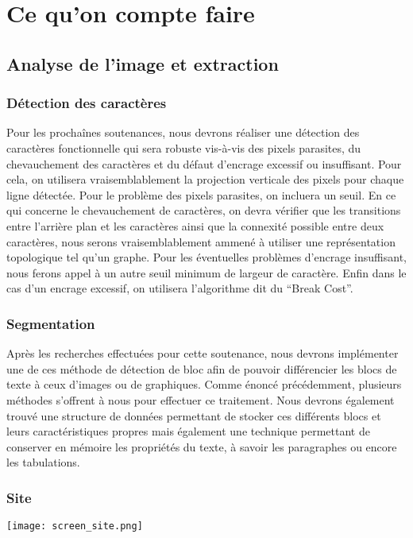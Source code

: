 \documentclass[]{report}
\begin{document}
\part{Ce qu'on compte faire} %
\label{prt:ce_qu_on_compte_faire}

	\chapter{Analyse de l'image et extraction} %
	\label{cha:analyse_de_l'image_et_extraction}

    \section{D\'etection des caractères} %
    \label{sec:d'etection_des_caractères}
      Pour les prochaînes soutenances, nous devrons réaliser une détection des caractères fonctionnelle qui sera robuste vis-à-vis des pixels parasites, du chevauchement des caractères et du défaut d'encrage excessif ou insuffisant. Pour cela, on utilisera vraisemblablement la projection verticale des pixels pour chaque ligne détectée. Pour le problème des pixels parasites, on incluera un seuil. En ce qui concerne le  chevauchement de caractères, on devra vérifier que les transitions entre l'arrière plan et les caractères ainsi que la connexité possible entre deux caractères, nous serons vraisemblablement ammené à utiliser une représentation topologique tel qu'un graphe. Pour les éventuelles problèmes d'encrage insuffisant, nous ferons appel à un autre seuil minimum de largeur de caractère. Enfin dans le cas d'un encrage excessif, on utilisera l'algorithme dit du ``Break Cost''.


    \section{Segmentation} %
    \label{sec:s\'egmentation}
  		Après les recherches effectuées pour cette soutenance, nous devrons implémenter une de ces méthode de détection de bloc afin de pouvoir différencier les blocs de texte à ceux d'images ou de graphiques. Comme énoncé précédemment, plusieurs méthodes s'offrent à nous pour effectuer ce traitement. Nous devrons également trouvé une structure de données permettant de stocker ces différents blocs et leurs caractéristiques propres mais également une technique permettant de conserver en mémoire les propriétés du texte, à savoir les paragraphes ou encore les tabulations.




\appendix

\section{Site} %
\label{sec:site}
	\texttt{[image: screen\_site.png]}
  


 
\end{document}
